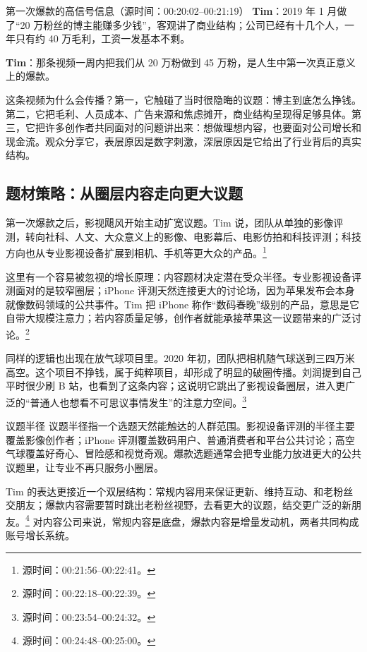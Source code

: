 \documentclass[a4paper]{article}
\begin{document}
\begin{dialoguebox}{第一次爆款的高信号信息（源时间：00:20:02--00:21:19）}
\textbf{Tim}：2019 年 1 月做了“20 万粉丝的博主能赚多少钱”，客观讲了商业结构；公司已经有十几个人，一年只有约 40 万毛利，工资一发基本不剩。

\textbf{Tim}：那条视频一周内把我们从 20 万粉做到 45 万粉，是人生中第一次真正意义上的爆款。
\end{dialoguebox}

这条视频为什么会传播？第一，它触碰了当时很隐晦的议题：博主到底怎么挣钱。第二，它把毛利、人员成本、广告来源和焦虑摊开，商业结构呈现得足够具体。第三，它把许多创作者共同面对的问题讲出来：想做理想内容，也要面对公司增长和现金流。观众分享它，表层原因是数字刺激，深层原因是它给出了行业背后的真实结构。

\subsection{题材策略：从圈层内容走向更大议题}

第一次爆款之后，影视飓风开始主动扩宽议题。Tim 说，团队从单独的影像评测，转向社科、人文、大众意义上的影像、电影幕后、电影仿拍和科技评测；科技方向也从专业影视设备扩展到相机、手机等更大众的产品。\footnote{源时间：00:21:56--00:22:41。}

这里有一个容易被忽视的增长原理：内容题材决定潜在受众半径。专业影视设备评测面对的是较窄圈层；iPhone 评测天然连接更大的讨论场，因为苹果发布会本身就像数码领域的公共事件。Tim 把 iPhone 称作“数码春晚”级别的产品，意思是它自带大规模注意力；若内容质量足够，创作者就能承接苹果这一议题带来的广泛讨论。\footnote{源时间：00:22:18--00:22:39。}

同样的逻辑也出现在放气球项目里。2020 年初，团队把相机随气球送到三四万米高空。这个项目不挣钱，属于纯粹项目，却形成了明显的破圈传播。刘润提到自己平时很少刷 B 站，也看到了这条内容；这说明它跳出了影视设备圈层，进入更广泛的“普通人也想看不可思议事情发生”的注意力空间。\footnote{源时间：00:23:54--00:24:32。}

\begin{knowledgebox}{议题半径}
议题半径指一个选题天然能触达的人群范围。影视设备评测的半径主要覆盖影像创作者；iPhone 评测覆盖数码用户、普通消费者和平台公共讨论；高空气球覆盖好奇心、冒险感和视觉奇观。爆款选题通常会把专业能力放进更大的公共议题里，让专业不再只服务小圈层。
\end{knowledgebox}

Tim 的表达更接近一个双层结构：常规内容用来保证更新、维持互动、和老粉丝交朋友；爆款内容需要暂时跳出老粉丝视野，去看更大的议题，结交更广泛的新朋友。\footnote{源时间：00:24:48--00:25:00。} 对内容公司来说，常规内容是底盘，爆款内容是增量发动机，两者共同构成账号增长系统。
\end{document}
